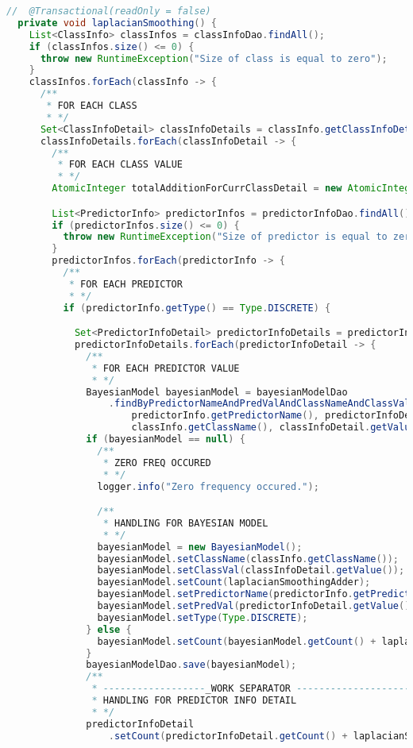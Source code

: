 \begin{lstlisting}[language=Java,basicstyle=\tiny,caption=BayesianModelService.java]
  //  @Transactional(readOnly = false)
  private void laplacianSmoothing() {
    List<ClassInfo> classInfos = classInfoDao.findAll();
    if (classInfos.size() <= 0) {
      throw new RuntimeException("Size of class is equal to zero");
    }
    classInfos.forEach(classInfo -> {
      /**
       * FOR EACH CLASS
       * */
      Set<ClassInfoDetail> classInfoDetails = classInfo.getClassInfoDetails();
      classInfoDetails.forEach(classInfoDetail -> {
        /**
         * FOR EACH CLASS VALUE
         * */
        AtomicInteger totalAdditionForCurrClassDetail = new AtomicInteger(0);

        List<PredictorInfo> predictorInfos = predictorInfoDao.findAll();
        if (predictorInfos.size() <= 0) {
          throw new RuntimeException("Size of predictor is equal to zero");
        }
        predictorInfos.forEach(predictorInfo -> {
          /**
           * FOR EACH PREDICTOR
           * */
          if (predictorInfo.getType() == Type.DISCRETE) {

            Set<PredictorInfoDetail> predictorInfoDetails = predictorInfo.getPredictorInfoDetails();
            predictorInfoDetails.forEach(predictorInfoDetail -> {
              /**
               * FOR EACH PREDICTOR VALUE
               * */
              BayesianModel bayesianModel = bayesianModelDao
                  .findByPredictorNameAndPredValAndClassNameAndClassVal(
                      predictorInfo.getPredictorName(), predictorInfoDetail.getValue(),
                      classInfo.getClassName(), classInfoDetail.getValue());
              if (bayesianModel == null) {
                /**
                 * ZERO FREQ OCCURED
                 * */
                logger.info("Zero frequency occured.");

                /**
                 * HANDLING FOR BAYESIAN MODEL
                 * */
                bayesianModel = new BayesianModel();
                bayesianModel.setClassName(classInfo.getClassName());
                bayesianModel.setClassVal(classInfoDetail.getValue());
                bayesianModel.setCount(laplacianSmoothingAdder);
                bayesianModel.setPredictorName(predictorInfo.getPredictorName());
                bayesianModel.setPredVal(predictorInfoDetail.getValue());
                bayesianModel.setType(Type.DISCRETE);
              } else {
                bayesianModel.setCount(bayesianModel.getCount() + laplacianSmoothingAdder);
              }
              bayesianModelDao.save(bayesianModel);
              /**
               * ------------------_WORK SEPARATOR --------------------
               * HANDLING FOR PREDICTOR INFO DETAIL
               * */
              predictorInfoDetail
                  .setCount(predictorInfoDetail.getCount() + laplacianSmoothingAdder);


\end{lstlisting}
